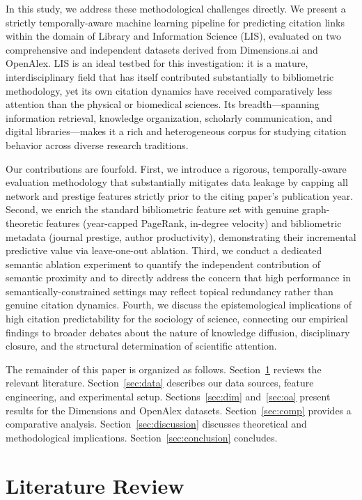 \documentclass[12pt,a4paper]{article}
\begin{document}
In this study, we address these methodological challenges directly. We present a
strictly temporally-aware machine learning pipeline for predicting citation links
within the domain of Library and Information Science (LIS), evaluated on two
comprehensive and independent datasets derived from Dimensions.ai and OpenAlex.
LIS is an ideal testbed for this investigation: it is a mature, interdisciplinary
field that has itself contributed substantially to bibliometric methodology, yet
its own citation dynamics have received comparatively less attention than the
physical or biomedical sciences. Its breadth---spanning information retrieval,
knowledge organization, scholarly communication, and digital libraries---makes it
a rich and heterogeneous corpus for studying citation behavior across diverse
research traditions.

Our contributions are fourfold. First, we introduce a rigorous, temporally-aware
evaluation methodology that substantially mitigates data leakage by capping all
network and prestige features strictly prior to the citing paper's publication year.
Second, we enrich the standard bibliometric feature set with genuine graph-theoretic
features (year-capped PageRank, in-degree velocity) and bibliometric metadata
(journal prestige, author productivity), demonstrating their incremental predictive
value via leave-one-out ablation. Third, we conduct a dedicated semantic ablation
experiment to quantify the independent contribution of semantic proximity and to
directly address the concern that high performance in semantically-constrained
settings may reflect topical redundancy rather than genuine citation dynamics.
Fourth, we discuss the epistemological implications of high citation predictability
for the sociology of science, connecting our empirical findings to broader debates
about the nature of knowledge diffusion, disciplinary closure, and the structural
determination of scientific attention.

The remainder of this paper is organized as follows. Section~\ref{sec:litreview}
reviews the relevant literature. Section~\ref{sec:data} describes our data sources,
feature engineering, and experimental setup. Sections~\ref{sec:dim}
and~\ref{sec:oa} present results for the Dimensions and OpenAlex datasets.
Section~\ref{sec:comp} provides a comparative analysis. Section~\ref{sec:discussion}
discusses theoretical and methodological implications. Section~\ref{sec:conclusion}
concludes.

\section{Literature Review}
\label{sec:litreview}
\end{document}
